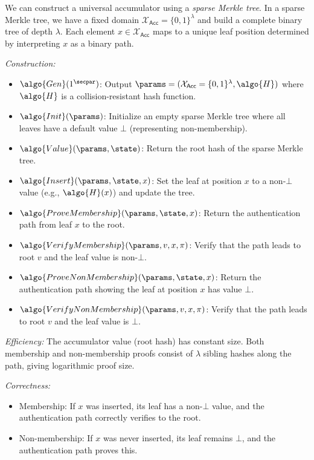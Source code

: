 \ifsolutions
\begin{mysolution}
  We can construct a universal accumulator using a \emph{sparse Merkle tree}.
  In a sparse Merkle tree, we have a fixed domain $\mathcal{X}_\mathsf{Acc} = \{0,1\}^\lambda$ and build a complete binary tree of depth $\lambda$.
  Each element $x \in \mathcal{X}_\mathsf{Acc}$ maps to a unique leaf position determined by interpreting $x$ as a binary path.
  
  \emph{Construction:}
  \begin{itemize}
    \item $\algo{Gen}(1^\secpar)$: Output $\params = (\mathcal{X}_\mathsf{Acc} = \{0,1\}^\lambda, \algo{H})$ where $\algo{H}$ is a collision-resistant hash function.
    \item $\algo{Init}(\params)$: Initialize an empty sparse Merkle tree where all leaves have a default value $\bot$ (representing non-membership).
    \item $\algo{Value}(\params, \state)$: Return the root hash of the sparse Merkle tree.
    \item $\algo{Insert}(\params, \state, x)$: Set the leaf at position $x$ to a non-$\bot$ value (e.g., $\algo{H}(x)$) and update the tree.
    \item $\algo{ProveMembership}(\params, \state, x)$: Return the authentication path from leaf $x$ to the root.
    \item $\algo{VerifyMembership}(\params, v, x, \pi)$: Verify that the path leads to root $v$ and the leaf value is non-$\bot$.
    \item $\algo{ProveNonMembership}(\params, \state, x)$: Return the authentication path showing the leaf at position $x$ has value $\bot$.
    \item $\algo{VerifyNonMembership}(\params, v, x, \pi)$: Verify that the path leads to root $v$ and the leaf value is $\bot$.
  \end{itemize}
  
  \emph{Efficiency:} The accumulator value (root hash) has constant size.
  Both membership and non-membership proofs consist of $\lambda$ sibling hashes along the path, giving logarithmic proof size.
  
  \emph{Correctness:} 
  \begin{itemize}
    \item Membership: If $x$ was inserted, its leaf has a non-$\bot$ value, and the authentication path correctly verifies to the root.
    \item Non-membership: If $x$ was never inserted, its leaf remains $\bot$, and the authentication path proves this.
  \end{itemize}
  

\end{mysolution}
